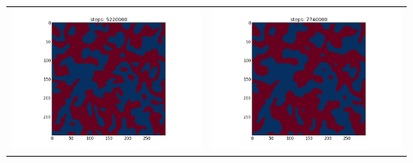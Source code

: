 \documentclass[12pt,a4paper,titlepage]{article}
\begin{document}
\begin{table}
\begin{tabular}{cc}
 \includegraphics[trim=4cm 0cm 1cm 0cm, width=7cm]{Plots/Trajectory_2D_4} & \includegraphics[trim=4cm 0cm 1cm 0cm, width=7cm]{Plots/Trajectory_2D_5} \\
\end{tabular} 

\end{table}
\end{document}
